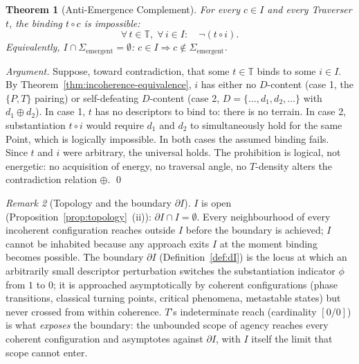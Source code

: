 \documentclass[11pt,a4paper]{article}
\newtheorem{theorem}{Theorem}[section]
\theoremstyle{definition}
\theoremstyle{remark}
\newtheorem{remark}[theorem]{Remark}
\begin{document}
\begin{theorem}[Anti-Emergence Complement]\label{thm:antiemergence-complement}
For every $c \in I$ and every Traverser $t$, the binding $t \circ c$ is impossible:
\[
\forall\, t \in \mathbb{T},\;\forall\, i \in I :\quad \neg(t \circ i).
\]
Equivalently, $I \cap \Sigma_{\mathrm{emergent}} = \emptyset$: $c \in I \Rightarrow c \notin \Sigma_{\mathrm{emergent}}$.
\end{theorem}

\begin{proof}[Argument]
Suppose, toward contradiction, that some $t \in \mathbb{T}$ binds to some $i \in I$. By Theorem~\ref{thm:incoherence-equivalence}, $i$ has either no $D$-content (case 1, the $\{P,T\}$ pairing) or self-defeating $D$-content (case 2, $D = \{\ldots, d_{1}, d_{2}, \ldots\}$ with $d_{1} \oplus d_{2}$). In case 1, $t$ has no descriptors to bind to: there is no terrain. In case 2, substantiation $t \circ i$ would require $d_{1}$ and $d_{2}$ to simultaneously hold for the same Point, which is logically impossible. In both cases the assumed binding fails. Since $t$ and $i$ were arbitrary, the universal holds. The prohibition is logical, not energetic: no acquisition of energy, no traversal angle, no $T$-density alters the contradiction relation $\oplus$. \qed
\end{proof}

\begin{remark}[Topology and the boundary $\partial I$]\label{rem:I-topology}
$I$ is open (Proposition~\ref{prop:topology}~(ii)): $\partial I \cap I = \emptyset$. Every neighbourhood of every incoherent configuration reaches outside $I$ before the boundary is achieved; $I$ cannot be inhabited because any approach exits $I$ at the moment binding becomes possible. The boundary $\partial I$ (Definition~\ref{def:dI}) is the locus at which an arbitrarily small descriptor perturbation switches the substantiation indicator $\phi$ from $1$ to $0$; it is approached asymptotically by coherent configurations (phase transitions, classical turning points, critical phenomena, metastable states) but never crossed from within coherence. $T$'s indeterminate reach (cardinality $[0/0]$) is what \emph{exposes} the boundary: the unbounded scope of agency reaches every coherent configuration and asymptotes against $\partial I$, with $I$ itself the limit that scope cannot enter.
\end{remark}
\end{document}
